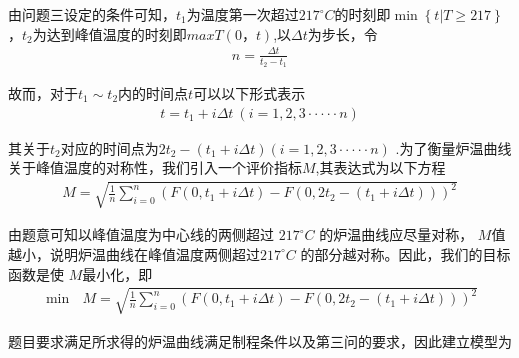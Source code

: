 \documentclass[../main.tex]{subfiles}
\begin{document}
\par  由问题三设定的条件可知，$t_1$为温度第一次超过$217^{\circ}C$的时刻即$\min \left\{ t|T\ge 217 \right\} $，$t_2$为达到峰值温度的时刻即$max T(0，t)$,以$\varDelta t$为步长，令
\begin{align}\label{9.1}
    n=\frac{\varDelta t}{t_2-t_1}
\end{align}
\par 故而，对于$t_1\sim t_2$内的时间点$t$可以以下形式表示
\begin{align}\label{9.2}
t=t_1+i\varDelta t\ \left( i=1,2,3\cdot \cdot \cdot \cdot \cdot n \right) 
\end{align}
\par 其关于$t_2$对应的时间点为$2t_2-\left( t_1+i\varDelta t \right) \left( i=1,2,3\cdot \cdot \cdot \cdot \cdot n \right)$ .为了衡量炉温曲线关于峰值温度的对称性，我们引入一个评价指标$ M$,其表达式为以下方程
\begin{align}
    M = \sqrt{\frac{1}{n} \sum_{i = 0}^{n} \left( F(0, t_1 + i\Delta t) - F(0, 2t_2 - (t_1 + i\Delta t)) \right)^2}
\end{align}
\par 由题意可知以峰值温度为中心线的两侧超过 \(217^{\circ}C\) 的炉温曲线应尽量对称， $M $值越小，说明炉温曲线在峰值温度两侧超过$ 217^{\circ}C$ 的部分越对称。因此，我们的目标函数是使 $M $最小化，即
\begin{align}
    \min\text{\ }M= \sqrt{\frac{1}{n} \sum_{i = 0}^{n} \left( F(0, t_1 + i\Delta t) - F(0, 2t_2 - (t_1 + i\Delta t)) \right)^2}
\end{align}
\par 题目要求满足所求得的炉温曲线满足制程条件以及第三问的要求，因此建立模型为
\end{document}
